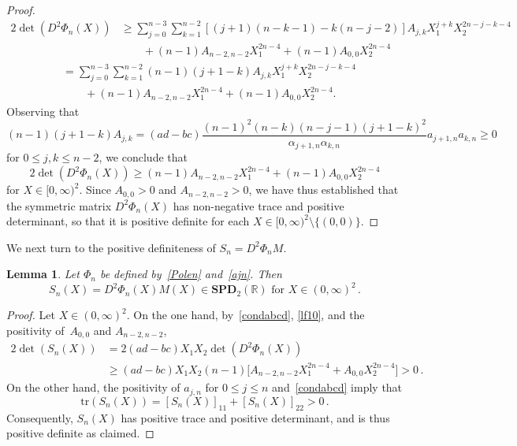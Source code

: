 \documentclass[10pt]{amsart}
\newtheorem{lemm}[theo]{Lemma}\newtheorem{prop}[theo]{Proposition}\newtheorem{coro}[theo]{Corollary}\newtheorem{conj}[theo]{Conjecture}
\theoremstyle{definition}\newtheorem{defi}[theo]{Definition}\newtheorem{rema}[theo]{Remark}\newtheorem{exam}[theo]{Example}\newtheorem{exem}[theo]{Example}\newtheorem{nota}[theo]{Notation}
\newcommand{\bbR}{\mathbb{R}}
\newcommand{\bSPD}{\mathbf{SPD}}
\newcommand{\trr}{\mathrm{tr}}
\begin{document}
\begin{proof}
\begin{align*}
2 \det\left(D^2\Phi_n(X)\right)& \ge \sum_{j=0}^{n-3} \sum_{k=1}^{n-2} \left[(j+1)(n-k-1) - k(n-j-2) \right] A_{j,k} X_1^{j+k} X_2^{2n-j-k-4} \\
& \qquad + (n-1) A_{n-2,n-2} X_1^{2n-4} + (n-1) A_{0,0} X_2^{2n-4}
\end{align*}
\begin{align*}
& = \sum_{j=0}^{n-3} \sum_{k=1}^{n-2} (n-1)(j+1-k) A_{j,k} X_1^{j+k} X_2^{2n-j-k-4} \\
& \qquad + (n-1) A_{n-2,n-2} X_1^{2n-4} + (n-1) A_{0,0} X_2^{2n-4}.
\end{align*}
Observing that
\begin{equation*}
(n-1)(j+1-k) A_{j,k} = (ad-bc) \frac{(n-1)^2(n-k)(n-j-1)(j+1-k)^2}{\alpha_{j+1,n}\alpha_{k,n}} a_{j+1,n} a_{k,n} \ge 0
\end{equation*}
for $0\le j, k\le n-2$, we conclude that
\begin{equation}\label{lf10}
2\det\left(D^2\Phi_n(X)\right) \ge (n-1) A_{n-2,n-2} X_1^{2n-4} + (n-1) A_{0,0} X_2^{2n-4} 
\end{equation}
for $X\in [0,\infty)^2$. Since $A_{0,0}>0$ and $A_{n-2,n-2}>0$, we have thus established that the symmetric matrix $D^2\Phi_n(X)$ has non-negative trace and positive determinant, so that it is positive definite for each $X\in [0,\infty)^2\setminus\{(0,0)\}$.
\end{proof}

We next turn to the positive definiteness of $S_n = D^2\Phi_n M$.


\begin{lemm}\label{lem.p3}
Let $\Phi_n$ be defined by~\eqref{Polen} and~\eqref{ajn}. Then
\[
S_n(X)=D^2\Phi_n(X)M(X)\in \bSPD_2(\bbR)\text{ for }X\in (0,\infty)^2\,.
\]
\end{lemm}


\begin{proof}
Let $X\in (0,\infty)^2$. On the one hand, by~\eqref{condabcd}, \eqref{lf10}, and the positivity of~$A_{0,0}$ and $A_{n-2,n-2}$,
\begin{align*}
2\det(S_n(X)) & = 2(ad-bc)X_1 X_2 \det\left(D^2\Phi_n(X)\right) \\
& \geq(ad-bc)X_1X_2(n-1) \Big[A_{n-2,n-2} X_1^{2n-4} + A_{0,0} X_2^{2n-4} \Big]>0\,.
\end{align*}
On the other hand, the positivity of $a_{j,n}$ for $0\le j \le n$ and~\eqref{condabcd} imply that
\begin{equation*}
\trr(S_n(X)) = [S_n(X)]_{11} + [S_n(X)]_{22}> 0\,.
\end{equation*}
Consequently, $S_n(X)$ has positive trace and positive determinant, and is thus positive definite as claimed.
\end{proof}
\end{document}
